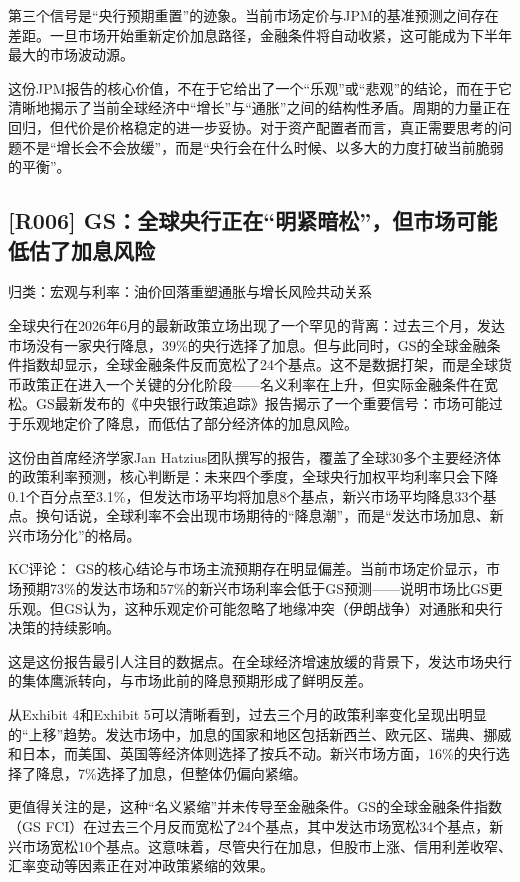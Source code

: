 \documentclass[11pt]{ctexart}
\begin{document}
第三个信号是“央行预期重置”的迹象。当前市场定价与JPM的基准预测之间存在差距。一旦市场开始重新定价加息路径，金融条件将自动收紧，这可能成为下半年最大的市场波动源。

这份JPM报告的核心价值，不在于它给出了一个“乐观”或“悲观”的结论，而在于它清晰地揭示了当前全球经济中“增长”与“通胀”之间的结构性矛盾。周期的力量正在回归，但代价是价格稳定的进一步妥协。对于资产配置者而言，真正需要思考的问题不是“增长会不会放缓”，而是“央行会在什么时候、以多大的力度打破当前脆弱的平衡”。

\subsection{[R006] GS：全球央行正在“明紧暗松”，但市场可能低估了加息风险}
{\small\color{refgray}归类：宏观与利率：油价回落重塑通胀与增长风险共动关系}

全球央行在2026年6月的最新政策立场出现了一个罕见的背离：过去三个月，发达市场没有一家央行降息，39\%的央行选择了加息。但与此同时，GS的全球金融条件指数却显示，全球金融条件反而宽松了24个基点。这不是数据打架，而是全球货币政策正在进入一个关键的分化阶段——名义利率在上升，但实际金融条件在宽松。GS最新发布的《中央银行政策追踪》报告揭示了一个重要信号：市场可能过于乐观地定价了降息，而低估了部分经济体的加息风险。

这份由首席经济学家Jan Hatzius团队撰写的报告，覆盖了全球30多个主要经济体的政策利率预测，核心判断是：未来四个季度，全球央行加权平均利率只会下降0.1个百分点至3.1\%，但发达市场平均将加息8个基点，新兴市场平均降息33个基点。换句话说，全球利率不会出现市场期待的“降息潮”，而是“发达市场加息、新兴市场分化”的格局。

KC评论： GS的核心结论与市场主流预期存在明显偏差。当前市场定价显示，市场预期73\%的发达市场和57\%的新兴市场利率会低于GS预测——说明市场比GS更乐观。但GS认为，这种乐观定价可能忽略了地缘冲突（伊朗战争）对通胀和央行决策的持续影响。

这是这份报告最引人注目的数据点。在全球经济增速放缓的背景下，发达市场央行的集体鹰派转向，与市场此前的降息预期形成了鲜明反差。

从Exhibit 4和Exhibit 5可以清晰看到，过去三个月的政策利率变化呈现出明显的“上移”趋势。发达市场中，加息的国家和地区包括新西兰、欧元区、瑞典、挪威和日本，而美国、英国等经济体则选择了按兵不动。新兴市场方面，16\%的央行选择了降息，7\%选择了加息，但整体仍偏向紧缩。

更值得关注的是，这种“名义紧缩”并未传导至金融条件。GS的全球金融条件指数（GS FCI）在过去三个月反而宽松了24个基点，其中发达市场宽松34个基点，新兴市场宽松10个基点。这意味着，尽管央行在加息，但股市上涨、信用利差收窄、汇率变动等因素正在对冲政策紧缩的效果。
\end{document}
